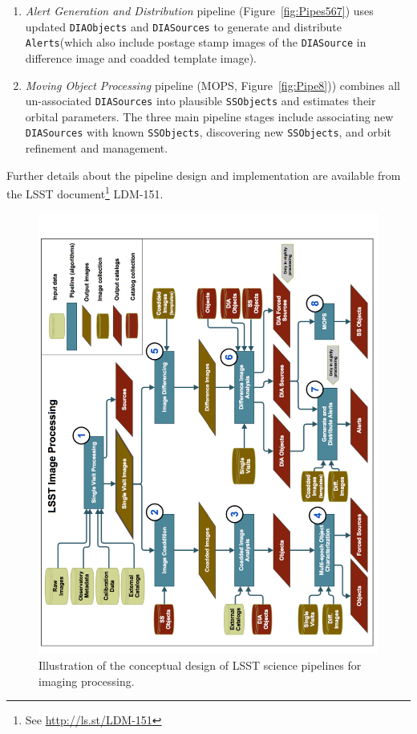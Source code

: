 \documentclass[12pt]{article}
\newcommand{\code}[1]{\texttt{#1}}
\newcommand{\Alerts}{\code{Alerts}\xspace}
\newcommand{\DIASource}{\code{DIASource}\xspace}
\newcommand{\DIASources}{\code{DIASources}\xspace}
\newcommand{\DIAObjects}{\code{DIAObjects}\xspace}
\newcommand{\SSObjects}{\code{SSObjects}\xspace}
\newcommand{\req}[1]{\marginpar{\tiny #1}}
\begin{document}
\begin{enumerate}
fits a library of image models to Footprints of these \DIASources, and for all \DIAObjects
overlapping the difference image it performs Forced Photometry and recomputes summary quantities.
During nightly Level 1 processing, this pipeline also performs Forced Photometry
for all new \DIAObjects on difference images from the last 30 days\req{precoveryWindow}.
\item \textit{Alert Generation and Distribution} pipeline (Figure~\ref{fig:Pipes567}) uses updated
\DIAObjects and \DIASources to generate and distribute \Alerts (which also include postage stamp
images of the \DIASource in difference image and coadded template image).
\item \textit{Moving Object Processing} pipeline (MOPS, Figure~\ref{fig:Pipe8})) combines all
un-associated \DIASources into plausible \SSObjects and estimates their orbital parameters.
The three main pipeline stages include associating new \DIASources with known \SSObjects,
discovering new \SSObjects, and orbit refinement and management.
\end{enumerate}

Further details about the pipeline design and implementation are available from the LSST
document\footnote{See \url{http://ls.st/LDM-151}} LDM-151\nocite{LDM-151}.

\begin{figure}[!t]
    \centering
    \vskip -0.1in
    \includegraphics[scale=0.515, angle=270]{gliffy/LSSTimageProcessingDetail1}
    \vskip -0.1in
    \caption{Illustration of the conceptual design of LSST science pipelines for imaging processing.\label{fig:Detail1}}
\end{figure}
\end{document}

